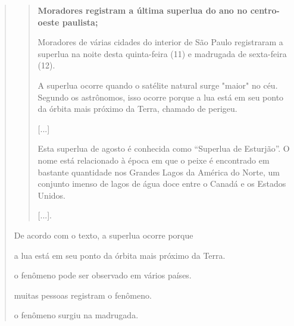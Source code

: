 \begin{quote}
\begin{quote}
\textbf{Moradores registram a última superlua do ano no centro-oeste
paulista;}

Moradores de várias cidades do interior de São Paulo registraram a
superlua na noite desta quinta-feira (11) e madrugada de sexta-feira
(12).

A superlua ocorre quando o satélite natural surge "maior" no céu.
Segundo os astrônomos, isso ocorre porque a lua está em seu ponto da
órbita mais próximo da Terra, chamado de perigeu.

{[}...{]}

Esta superlua de agosto é conhecida como ``Superlua de Esturjão''. O
nome está relacionado à época em que o peixe é encontrado em bastante
quantidade nos Grandes Lagos da América do Norte, um conjunto imenso de
lagos de água doce entre o Canadá e os Estados Unidos.

{[}...{]}.

\end{quote}

De acordo com o texto, a superlua ocorre porque

\begin{escolha}
\item a lua está em seu ponto da órbita mais próximo da Terra.

\item o fenômeno pode ser observado em vários países.

\item muitas pessoas registram o fenômeno.

\item o fenômeno surgiu na madrugada.
\end{escolha}



\end{quote}
